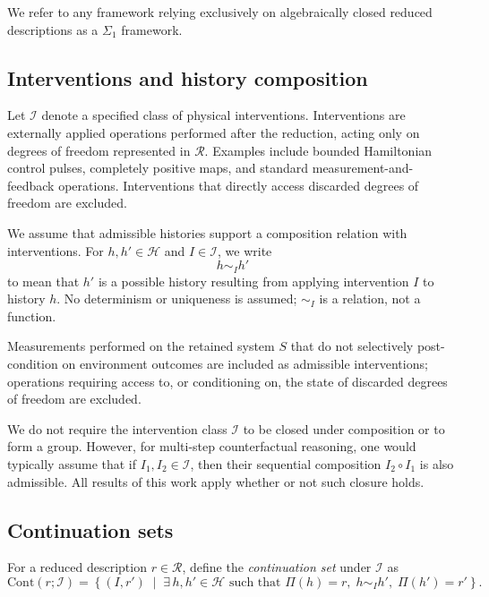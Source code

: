 We refer to any framework relying exclusively on algebraically closed reduced descriptions
as a $\Sigma_1$ framework.

\subsection{Interventions and history composition}

Let $\mathcal{I}$ denote a specified class of physical interventions. Interventions are
externally applied operations performed after the reduction, acting only on degrees of
freedom represented in $\mathcal{R}$. Examples include bounded Hamiltonian control pulses,
completely positive maps, and standard measurement-and-feedback operations. Interventions
that directly access discarded degrees of freedom are excluded.

We assume that admissible histories support a composition relation with interventions.
For $h,h' \in \mathcal{H}$ and $I \in \mathcal{I}$, we write
\begin{equation}
h \sim_I h'
\end{equation}
to mean that $h'$ is a possible history resulting from applying intervention $I$ to history
$h$. No determinism or uniqueness is assumed; $\sim_I$ is a relation, not a function. 

Measurements performed on the retained system $S$ that do not selectively post-condition on
environment outcomes are included as admissible interventions; operations requiring access to,
or conditioning on, the state of discarded degrees of freedom are excluded.

We do not require the intervention class $\mathcal{I}$ to be closed under composition or to form
a group. However, for multi-step counterfactual reasoning, one would typically assume that if
$I_1, I_2 \in \mathcal{I}$, then their sequential composition $I_2 \circ I_1$ is also admissible.
All results of this work apply whether or not such closure holds.

\subsection{Continuation sets}

For a reduced description $r \in \mathcal{R}$, define the \emph{continuation set} under
$\mathcal{I}$ as
\begin{equation}
\mathrm{Cont}(r;\mathcal{I})
=
\left\{
(I, r') \;\middle|\;
\exists\, h,h' \in \mathcal{H} \text{ such that }
\Pi(h)=r,\; h \sim_I h',\; \Pi(h')=r'
\right\}.
\end{equation}


